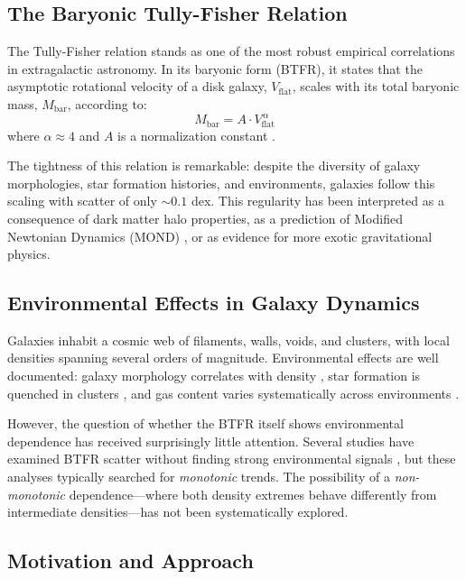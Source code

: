 \documentclass[12pt,a4paper]{article}
\newcommand{\Mbar}{M_{\text{bar}}}
\newcommand{\Vflat}{V_{\text{flat}}}
\begin{document}
\subsection{The Baryonic Tully-Fisher Relation}

The Tully-Fisher relation \citep{Tully1977} stands as one of the most robust empirical correlations in extragalactic astronomy. In its baryonic form (BTFR), it states that the asymptotic rotational velocity of a disk galaxy, $\Vflat$, scales with its total baryonic mass, $\Mbar$, according to:
\begin{equation}
\Mbar = A \cdot \Vflat^{\,\alpha}
\label{eq:btfr}
\end{equation}
where $\alpha \approx 4$ and $A$ is a normalization constant \citep{McGaugh2000, McGaugh2012, Lelli2016}.

The tightness of this relation is remarkable: despite the diversity of galaxy morphologies, star formation histories, and environments, galaxies follow this scaling with scatter of only $\sim 0.1$ dex. This regularity has been interpreted as a consequence of dark matter halo properties, as a prediction of Modified Newtonian Dynamics (MOND) \citep{Milgrom1983}, or as evidence for more exotic gravitational physics.

\subsection{Environmental Effects in Galaxy Dynamics}

Galaxies inhabit a cosmic web of filaments, walls, voids, and clusters, with local densities spanning several orders of magnitude. Environmental effects are well documented: galaxy morphology correlates with density \citep{Dressler1980}, star formation is quenched in clusters \citep{Gunn1972}, and gas content varies systematically across environments \citep{Haynes1984}.

However, the question of whether the BTFR itself shows environmental dependence has received surprisingly little attention. Several studies have examined BTFR scatter without finding strong environmental signals \citep{Ponomareva2018, Lelli2019}, but these analyses typically searched for \textit{monotonic} trends. The possibility of a \textit{non-monotonic} dependence---where both density extremes behave differently from intermediate densities---has not been systematically explored.

\subsection{Motivation and Approach}
\end{document}
